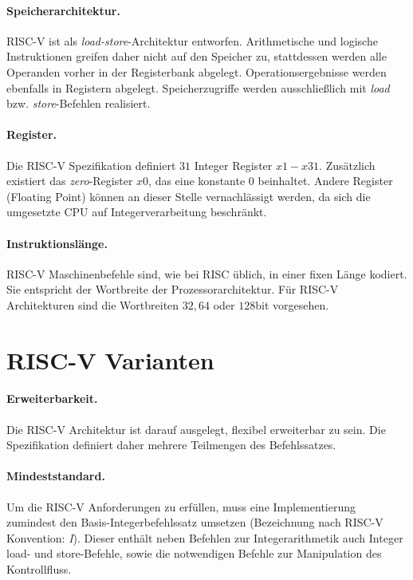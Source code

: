 \paragraph{Speicherarchitektur.} RISC-V ist als \textit{load-store}-Architektur entworfen. Arithmetische und logische Instruktionen greifen daher nicht auf den Speicher zu, stattdessen werden alle Operanden vorher in der Registerbank abgelegt. Operationsergebnisse werden ebenfalls in Registern abgelegt. Speicherzugriffe werden ausschließlich mit \textit{load} bzw. \textit{store}-Befehlen realisiert.

\paragraph{Register.} Die RISC-V Spezifikation definiert $31$ Integer Register $x1 - x31$. Zusätzlich existiert das \textit{zero}-Register $x0$, das eine konstante $0$ beinhaltet. Andere Register (Floating Point) können an dieser Stelle vernachlässigt werden, da sich die umgesetzte CPU auf Integerverarbeitung beschränkt.

\paragraph{Instruktionslänge.} RISC-V Maschinenbefehle sind, wie bei RISC üblich, in einer fixen Länge kodiert. Sie entspricht der Wortbreite der Prozessorarchitektur. Für RISC-V Architekturen sind die Wortbreiten $32, 64$ oder $128$bit vorgesehen.

\section{RISC-V Varianten}
\label{sec:erweiterung}

\paragraph{Erweiterbarkeit.} Die RISC-V Architektur ist darauf ausgelegt, flexibel erweiterbar zu sein. Die Spezifikation definiert daher mehrere Teilmengen des Befehlssatzes. \cite[p. 4]{RISC}

\paragraph{Mindeststandard.} Um die RISC-V Anforderungen zu erfüllen, muss eine Implementierung zumindest den Basis-Integerbefehlssatz umsetzen (Bezeichnung nach \mbox{RISC-V} Konvention: \textit{I}). Dieser enthält neben Befehlen zur Integerarithmetik auch Integer load- und store-Befehle, sowie die notwendigen Befehle zur Manipulation des Kontrollfluss.

